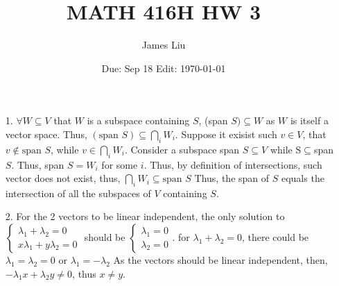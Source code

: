 \documentclass{article}
\date{Due: Sep 18 Edit: \today}
\title{MATH 416H HW 3}
\author{James Liu}
\begin{document}
\maketitle

\begin{itemize}
    \item [1.] \(\forall W \subseteq V\) that \(W\) is a subspace containing \(S\), (span \(S)\subseteq W\) as 
    \(W\) is itself a vector space. Thus, \((\text{span }S)\subseteq\bigcap_i W_i\). Suppose it exisist such \(v\in V\), that \(v\notin \text{span }S\), while \(v\in \bigcap_iW_i\). Consider a subspace span \(S\subseteq V\) while S\(\subseteq\)span \(S\). Thus, span \(S=W_i\) for some \(i\). Thus, by definition of intersections, such vector does not exist, thus, \(\bigcap_iW_i\subseteq\text{span }S\)
    Thus, the span of \(S\) equals the intersection of all
    the subspaces of \( V\) containing \(S\).
    \item [2.] For the 2 vectors to be linear independent, the only solution to \(\left\{\begin{matrix}
    \lambda_1+\lambda_2 = 0\\
    x\lambda_1+y\lambda_2 = 0
    \end{matrix}\right.\) 
    should be \(\left\{\begin{matrix}
        \lambda_1=0\\\lambda_2 = 0
    \end{matrix}\right.\).
    for \(\lambda_1+\lambda_2 = 0\), there could be \(\lambda_1=\lambda_2=0\) or \(\lambda_1=-\lambda_2\) As the vectors should  be linear independent, then, \(-\lambda_1x+\lambda_2y\neq0\), thus \(x\neq y\).\\


\end{itemize}
\end{document}

